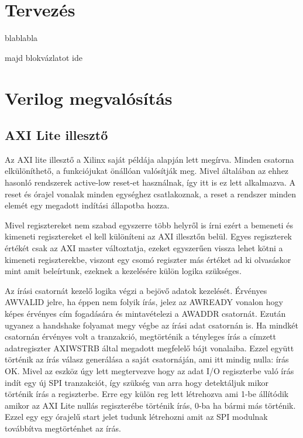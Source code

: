 \documentclass[a4paper,11pt]{article}
\begin{document}
\section{Tervezés}

blablabla

majd blokvázlatot ide

\section{Verilog megvalósítás}

\subsection{AXI Lite illesztő}
Az AXI lite illesztő a Xilinx saját példája alapján lett megírva. Minden csatorna elkülöníthető, a funkciójukat önállóan valósítják meg. Mivel általában az ehhez hasonló rendszerek active-low reset-et használnak, így itt is ez lett alkalmazva. A reset és órajel vonalak minden egységhez csatlakoznak, a reset a rendszer minden elemét egy megadott indítási állapotba hozza.

Mivel regisztereket nem szabad egyszerre több helyről is írni ezért a bemeneti és kimeneti regisztereket el kell különíteni az AXI illesztőn belül. Egyes regiszterek értékét csak az AXI master változtatja, ezeket egyszerűen vissza lehet kötni a kimeneti regiszterekbe, viszont egy csomó regiszter más értéket ad ki olvasáskor mint amit beleírtunk, ezeknek a kezelésére külön logika szükséges.

Az írási csatornát kezelő logika végzi a bejövő adatok kezelését. Érvényes AWVALID jelre, ha éppen nem folyik írás, jelez az AWREADY vonalon hogy képes érvényes cím fogadására és mintavételezi a AWADDR csatornát. Ezután ugyanez a handshake folyamat megy végbe az írási adat csatornán is. Ha mindkét csatornán érvényes volt a tranzakció, megtörténik a tényleges írás a címzett adatregiszter AXI\textunderscore WSTRB által megadott megfelelő bájt vonalaiba. Ezzel együtt történik az írás válasz generálása a saját csatornáján, ami itt mindig nulla: írás OK. Mivel az eszköz úgy lett megtervezve hogy az adat I/O regiszterbe való írás indít egy új SPI tranzakciót, így szükség van arra hogy detektáljuk mikor történik írás a regiszterbe. Erre egy külön reg lett létrehozva ami 1-be állítódik amikor az AXI Lite nullás regiszterébe történik írás, 0-ba ha bármi más történik. Ezzel egy egy órajelű start jelet tudunk létrehozni amit az SPI modulnak továbbítva megtörténhet az írás.
\end{document}
